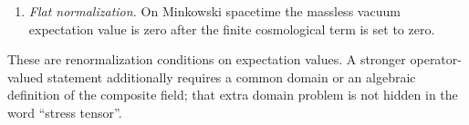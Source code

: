 \begin{definition}
\begin{enumerate}
from nonpolynomial functionals such as
\(\int\sqrt{|g|}\,m^4F(R/m^2)\).  Smooth parameter dependence at \(m^2=0\),
local covariance, and almost homogeneous scaling reduce the allowed
dimension-four local tensors to the finite list classified below.  A change
of the Hadamard length scale is allowed to produce only local logarithmic
terms of the same dimension; this is the curved-space form of the
trace-anomaly ambiguity.
\item \emph{Flat normalization.}  On Minkowski spacetime the massless
vacuum expectation value is zero after the finite cosmological term is set
to zero.
\end{enumerate}
These are renormalization conditions on expectation values.  A stronger
operator-valued statement additionally requires a common domain or an
algebraic definition of the composite field; that extra domain problem is
not hidden in the word ``stress tensor''.
\end{definition}


